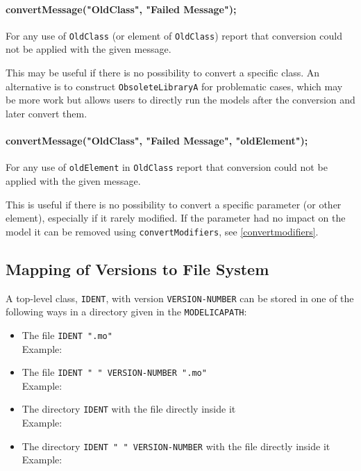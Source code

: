 \paragraph*{convertMessage("OldClass", "Failed Message");}\label{convertmessageoldclass-failed-message}

For any use of \lstinline!OldClass! (or element of \lstinline!OldClass!) report that conversion
could not be applied with the given message.

\begin{nonnormative}
This may be useful if there is no possibility to convert a specific class. An alternative is to construct \lstinline!ObsoleteLibraryA! for problematic
cases, which may be more work but allows users to directly run the models after the conversion and later convert them.
\end{nonnormative}

\paragraph*{convertMessage("OldClass", "Failed Message", "oldElement");}\label{convertmessageoldclass-failed-message2}

For any use of \lstinline!oldElement! in \lstinline!OldClass! report that conversion
could not be applied with the given message.

\begin{nonnormative}
This is useful if there is no possibility to convert a specific parameter (or other element), especially if it rarely modified.  If the parameter had no impact on the model it can be removed using \lstinline!convertModifiers!, see \cref{convertmodifiers}.
\end{nonnormative}

\subsection{Mapping of Versions to File System}\label{mapping-of-versions-to-file-system}

A top-level class, \lstinline!IDENT!, with version \lstinline!VERSION-NUMBER! can be stored in
one of the following ways in a directory given in the \lstinline!MODELICAPATH!:
\begin{itemize}
\item
  The file \lstinline!IDENT ".mo"!\\
  Example: 
\item
  The file \lstinline!IDENT " " VERSION-NUMBER ".mo"!\\
  Example: 
\item
  The directory \lstinline!IDENT! with the file  directly inside it\\
  Example: 
\item
  The directory \lstinline!IDENT " " VERSION-NUMBER! with the file  directly inside it\\
  Example: 
\end{itemize}

